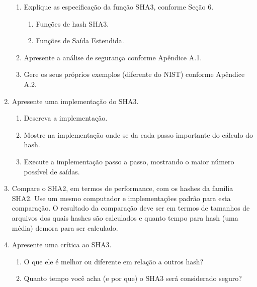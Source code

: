 \documentclass[conference]{IEEEtran}
\begin{document}
\begin{enumerate}
\begin{enumerate}
\item Explique as especificação da função SHA3, conforme Seção 6.

\begin{enumerate}

\item Funções de hash SHA3.

\item Funções de Saída Estendida.

\end{enumerate}

\item Apresente a análise de segurança conforme Apêndice A.1.

\item Gere os seus próprios exemplos (diferente do NIST) conforme Apêndice A.2.

\end{enumerate}

\item Apresente uma implementação do SHA3.

\begin{enumerate}

\item Descreva a implementação.

\item Mostre na implementação onde se da cada passo importante do cálculo do
hash.

\item Execute a implementação passo a passo, mostrando o maior número possível
de saídas.

\end{enumerate}

\item Compare o SHA2, em termos de performance, com os hashes da família SHA2.
Use um mesmo computador e implementações padrão para esta comparação. O
resultado da comparação deve ser em termos de tamanhos de arquivos dos quais
hashes são calculados e quanto tempo para hash (uma média) demora para ser
calculado.

\item Apresente uma crítica ao SHA3.

\begin{enumerate}

\item O que ele é melhor ou diferente em relação a outros hash?

\item Quanto tempo você acha (e por que) o SHA3 será considerado
seguro?

\end{enumerate}

\end{enumerate}
\end{document}
